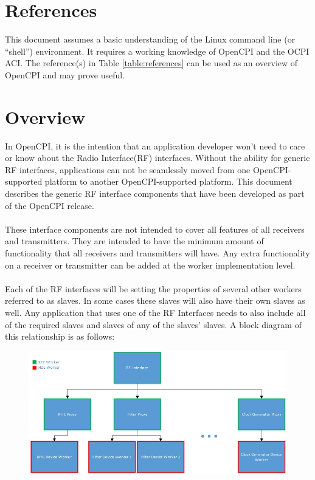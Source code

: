 \newpage

\tableofcontents

\newpage

\section{References}

	This document assumes a basic understanding of the Linux command line (or ``shell'') environment. It requires a working knowledge of OpenCPI and the OCPI ACI.  The reference(s) in Table \ref{table:references} can be used as an overview of OpenCPI and may prove useful.


\newpage
\section{Overview}
In OpenCPI, it is the intention that an application developer won't need to care or know about the Radio Interface(RF) interfaces.  Without the ability for generic RF interfaces, applications can not be seamlessly moved from one OpenCPI-supported platform to another OpenCPI-supported platform.  This document describes the generic RF interface components that have been developed as part of the OpenCPI release.  \\ \\
These interface components are not intended to cover all features of all receivers and transmitters.  They are intended to have the minimum amount of functionality that all receivers and transmitters will have.  Any extra functionality on a receiver or transmitter can be added at the worker implementation level. \\ \\
Each of the RF interfaces will be setting the properties of several other workers referred to as slaves.  In some cases these slaves will also have their own slaves as well.  Any application that uses one of the RF Interfaces needs to also include all of the required slaves and slaves of any of the slaves' slaves.  A block diagram of this relationship is as follows:

	\begin{figure}[h]
	 	\centering
	 	\includegraphics[scale=0.75]{figures/Generic_FE_diagram.jpg}
	\end{figure}
\newpage
